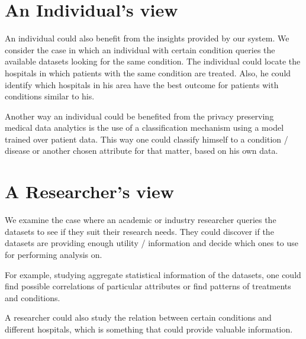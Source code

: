 \section{An Individual's view}
An individual could also benefit from the insights provided by our system.
We consider the case in which an individual with certain condition queries the available datasets looking for the same condition.
The individual could locate the hospitals in which patients with the same condition are treated.
Also, he could identify which hospitals in his area have the best outcome for patients with conditions similar to his.

Another way an individual could be benefited from the privacy preserving medical data analytics is the use of a classification mechanism using a model trained over patient data.
This way one could classify himself to a condition / disease or another chosen attribute for that matter, based on his own data.

\section{A Researcher's view}
We examine the case where an academic or industry researcher queries the datasets to see if they suit their research needs.
They could discover if the datasets are providing enough utility / information and decide which ones to use for performing analysis on.

For example, studying aggregate statistical information of the datasets, one could find possible correlations of particular attributes or find patterns of treatments and conditions.

A researcher could also study the relation between certain conditions and different hospitals, which is something that could provide valuable information.



%
%

